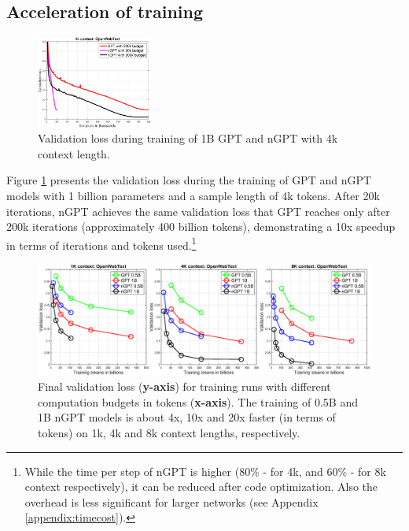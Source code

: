 \documentclass{article} %
\begin{document}
\subsection{Acceleration of training}
\begin{figure}[h]
     \centering
    \includegraphics[width=0.34\textwidth]{conv1B.eps} %
    \caption{Validation loss during training of 1B GPT and nGPT with 4k context length.}
    \label{figure_conv1B}
\end{figure}


Figure \ref{figure_conv1B} presents the  validation loss during the training of GPT and nGPT models with 1 billion parameters and a sample length of 4k tokens. After 20k iterations, nGPT achieves the same validation loss that GPT reaches only after 200k iterations (approximately 400 billion tokens), demonstrating a 10x speedup in terms of iterations and tokens used.\footnote{ While the time per step of nGPT is higher (80\% - for 4k, and 60\% - for 8k context respectively), it can be reduced after code optimization. Also the overhead is less significant for larger networks (see Appendix \ref{appendix:timecost}).} 

\begin{figure}[h]
\begin{center}
    \includegraphics[width=1.0\textwidth]{loss.eps} 
\caption{
Final validation loss (\textbf{y-axis}) for training runs with different computation budgets in tokens (\textbf{x-axis}). The training of 0.5B and 1B nGPT models is about 4x, 10x and 20x faster (in terms of tokens) on 1k, 4k and 8k context lengths, respectively.}
\label{figure_scalingLoss}
\end{center}
\end{figure}
\end{document}
